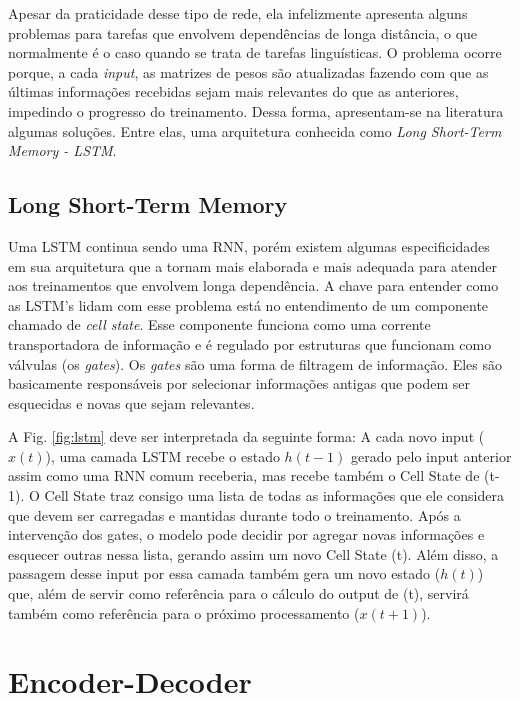 Apesar da praticidade desse tipo de rede, ela infelizmente apresenta alguns problemas para tarefas que envolvem dependências de longa distância, o que normalmente é o caso quando se trata de tarefas linguísticas. O problema ocorre porque, a cada \textit{input}, as matrizes de pesos são atualizadas fazendo com que as últimas informações recebidas sejam mais relevantes do que as anteriores, impedindo o progresso do treinamento. Dessa forma, apresentam-se na literatura algumas soluções. Entre elas, uma arquitetura conhecida como \textit{Long Short-Term Memory - LSTM}.



\subsection{Long Short-Term Memory}
\label{sec:LSTM}

Uma LSTM continua sendo uma RNN, porém existem algumas especificidades em sua arquitetura que a tornam mais elaborada e mais adequada para atender aos treinamentos que envolvem longa dependência. A chave para entender como as LSTM's lidam com esse problema está no entendimento de um componente chamado de \textit{cell state}. Esse componente funciona como uma corrente transportadora de informação e é regulado por estruturas que funcionam como válvulas (os \textit{gates}). Os \textit{gates} são uma forma de filtragem de informação. Eles são basicamente responsáveis por selecionar informações antigas que podem ser esquecidas e novas que sejam relevantes. 



A Fig. \ref{fig:lstm} deve ser interpretada da seguinte forma: A cada novo input ($x(t)$), uma camada LSTM recebe o estado $h(t-1)$ gerado pelo input anterior assim como uma RNN comum receberia, mas recebe também o Cell State de (t-1). O Cell State traz consigo uma lista de todas as informações que ele considera que devem ser carregadas e mantidas durante todo o treinamento. Após a intervenção dos gates, o modelo pode decidir por agregar novas informações e esquecer outras nessa lista, gerando assim um novo Cell State (t). Além disso, a passagem desse input por essa camada também gera um novo estado ($h(t)$) que, além de servir como referência para o cálculo do output de (t), servirá também como referência para o próximo processamento ($x(t+1)$). %

\section{Encoder-Decoder}

